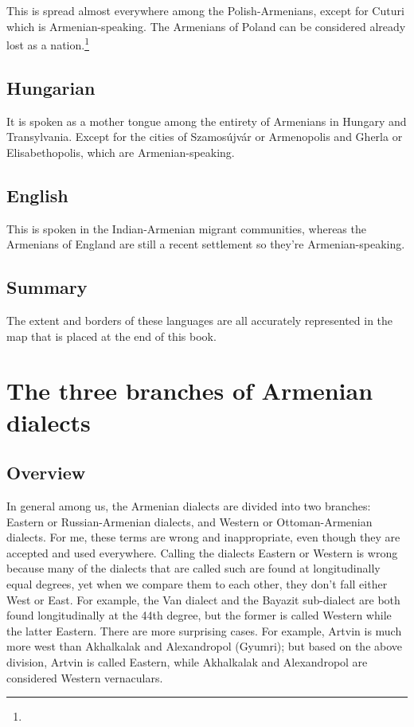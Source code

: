 This is spread almost everywhere among the Polish-Armenians, except for Cuturi which is Armenian-speaking. The Armenians of Poland can be considered already  lost as a nation.\footnote{}

\section{Hungarian}

It is spoken as a mother tongue among the entirety of Armenians in Hungary and Transylvania. Except for the cities of Szamosújvár or Armenopolis and Gherla or Elisabethopolis, which are Armenian-speaking.


\section{English}

This is spoken in the Indian-Armenian migrant communities, whereas the Armenians of England are still a recent settlement so they're Armenian-speaking. 

\section{Summary}
The extent and borders of these languages are all accurately represented in the map that is placed at the end of this book. 




\chapter{The three branches of Armenian dialects}\label{chapter:Branches}

\section{Overview}\label{sec:ThreeBranch:overview}

\begin{adjarianpage}\label{page:34}\end{adjarianpage}%



In general among us, the Armenian dialects are divided into two branches: Eastern or Russian-Armenian dialects, and Western or Ottoman-Armenian dialects. For me, these terms are wrong and inappropriate, even though they are accepted and used everywhere. Calling the dialects Eastern or Western is wrong because many of the dialects that are called such are found at longitudinally equal degrees, yet when we compare them to each other, they don't fall either West or East. For example, the Van dialect and the Bayazit sub-dialect are both found longitudinally at the 44th degree, but the former is called Western while the latter Eastern. There are more surprising cases. For example, Artvin is much more west than Akhalkalak and Alexandropol (Gyumri); but based on the above division, Artvin is called Eastern, while Akhalkalak and Alexandropol are considered Western vernaculars. 

